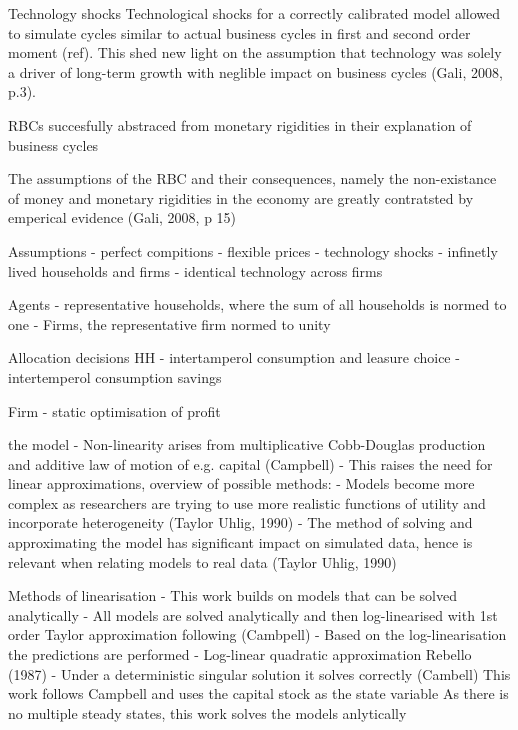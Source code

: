 \documentclass[11pt,a4paper,english]{article} %
\begin{document}
	Technology shocks
	Technological shocks for a correctly calibrated model allowed to simulate cycles similar to actual business cycles in first and second order moment (ref). This shed new light on the assumption that technology was solely a driver of long-term growth with neglible impact on business cycles (Gali, 2008, p.3).
	
	RBCs succesfully abstraced from monetary rigidities in their explanation of business cycles
	
	The assumptions of the RBC and their consequences, namely the non-existance of money and monetary rigidities in the economy are greatly contratsted by emperical evidence (Gali, 2008, p 15)
	
		
	
	Assumptions
	- perfect compitions
	- flexible prices
	- technology shocks
	- infinetly lived households and firms
	- identical technology across firms
	
	Agents
	- representative households, where the sum of all households is normed to one
	- Firms, the representative firm normed to unity
	
	Allocation decisions
	HH
	- intertamperol consumption and leasure choice
	- intertemperol consumption savings 
	
	Firm
	- static optimisation of profit
	
	
	the model
	-	Non-linearity arises from multiplicative Cobb-Douglas production and additive law of motion of e.g. capital (Campbell)
	- This raises the need for linear approximations, overview of possible methods:
	- Models become more complex as researchers are trying to use more realistic functions of utility and incorporate heterogeneity (Taylor  Uhlig, 1990)
	- The method of solving and approximating the model has significant impact on simulated data, hence is relevant when relating models to real data (Taylor  Uhlig, 1990)
	
	
	Methods of linearisation
	-	This work builds on models that can be solved analytically
	- All models are solved analytically and then log-linearised with 1st order Taylor approximation following (Cambpell)
	- Based on the log-linearisation the predictions are performed
	- Log-linear quadratic approximation Rebello (1987)
	- Under a deterministic singular solution it solves correctly (Cambell)
	This work follows Campbell and uses the capital stock as the state variable
	As there is no multiple steady states, this work solves the models anlytically
	
	
	
\end{document}
